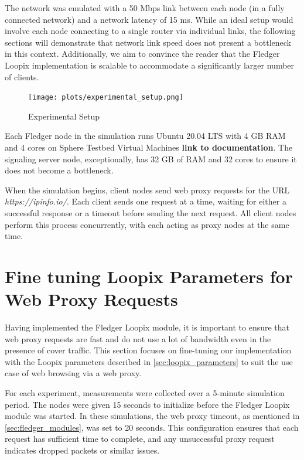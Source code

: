 \documentclass[a4paper,11pt,oneside]{report}
\begin{document}
The network was emulated with a 50 Mbps link between each node (in a fully connected network) and a network latency of 15 ms. While an ideal setup would involve each node connecting to a single router via individual links, the following sections will demonstrate that network link speed does not present a bottleneck in this context. Additionally, we aim to convince the reader that the Fledger Loopix implementation is scalable to accommodate a significantly larger number of clients.

\begin{figure}[H]
    \centering
    \texttt{[image: plots/experimental\_setup.png]}
    \caption{Experimental Setup}
    \label{fig:setup}
\end{figure}


Each Fledger node in the simulation runs Ubuntu 20.04 LTS with 4 GB RAM and 4 cores on Sphere Testbed Virtual Machines \textbf{link to documentation}. The signaling server node, exceptionally, has 32 GB of RAM and 32 cores to ensure it does not become a bottleneck.

When the simulation begins, client nodes send web proxy requests for the URL \textit{https://ipinfo.io/}. Each client sends one request at a time, waiting for either a successful response or a timeout before sending the next request. All client nodes perform this process concurrently, with each acting as proxy nodes at the same time.

\section{Fine tuning Loopix Parameters for Web Proxy Requests}
\label{sec:finetune}

Having implemented the Fledger Loopix module, it is important to ensure that web proxy requests are fast and do not use a lot of bandwidth even in the presence of cover traffic. This section focuses on fine-tuning our implementation with the Loopix parameters described in \autoref{sec:loopix_parameters} to suit the use case of web browsing via a web proxy.

For each experiment, measurements were collected over a 5-minute simulation period. The nodes were given 15 seconds to initialize before the Fledger Loopix module was started. In these simulations, the web proxy timeout, as mentioned in \autoref{sec:fledger_modules}, was set to 20 seconds. This configuration ensures that each request has sufficient time to complete, and any unsuccessful proxy request indicates dropped packets or similar issues.
\end{document}
